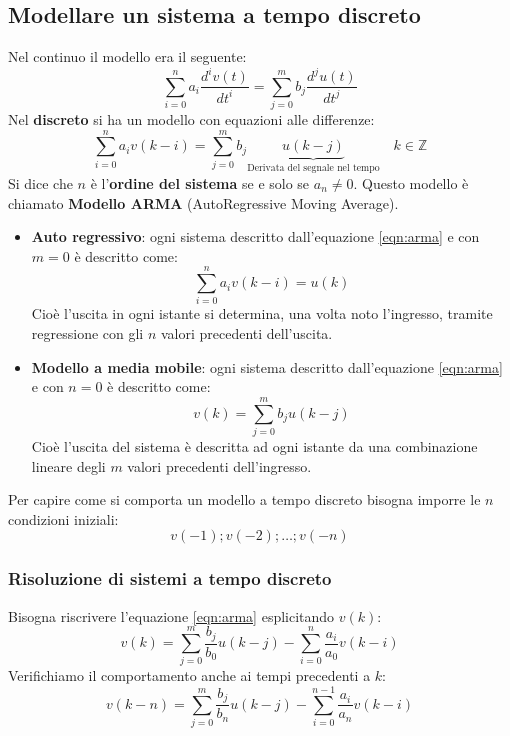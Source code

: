 \documentclass[a4paper]{article}
\begin{document}
\subsection{Modellare un sistema a tempo discreto}
Nel continuo il modello era il seguente:
\[
    \sum_{i = 0}^{n} a_i \frac{d^i v(t)}{dt^i} = \sum_{j = 0}^{m} b_j \frac{d^j u(t)}{dt^j}
\] 
Nel \textbf{discreto} si ha un modello con equazioni alle differenze:
\begin{equation}
  \label{eqn:arma}
    \sum_{i = 0}^{n} a_i v(k-i) = \sum_{j = 0}^{m} b_j 
    \underbrace{u(k-j)}_{\text{Derivata del segnale nel tempo}} \quad k \in \mathbb{Z}
\end{equation}
Si dice che \( n \) è l'\textbf{ordine del sistema} se e solo se \( a_n \neq 0 \).
Questo modello è chiamato \textbf{Modello ARMA} (AutoRegressive Moving Average).
\begin{itemize}
  \item \textbf{Auto regressivo}: ogni sistema descritto dall'equazione \ref{eqn:arma}
    e con \( m = 0 \) è descritto come:
    \[
      \sum_{i = 0}^{n} a_i v(k-i) = u(k)
    \] 
    Cioè l'uscita in ogni istante si determina, una volta noto l'ingresso, tramite
    regressione con gli \( n \) valori precedenti dell'uscita.
  \item \textbf{Modello a media mobile}: ogni sistema descritto dall'equazione \ref{eqn:arma}
    e con \( n = 0 \) è descritto come:
    \[
      v(k) = \sum_{j = 0}^{m} b_j u(k-j)
    \] 
    Cioè l'uscita del sistema è descritta ad ogni istante da una combinazione lineare
    degli \( m \) valori precedenti dell'ingresso.
\end{itemize}
Per capire come si comporta un modello a tempo discreto bisogna imporre le \( n \) condizioni
iniziali:
\[
  v(-1); v(-2); \ldots; v(-n)
\] 

\subsubsection{Risoluzione di sistemi a tempo discreto}
Bisogna riscrivere l'equazione \ref{eqn:arma} esplicitando \( v(k) \):
\[
  v(k) = \sum_{j = 0}^{m} \frac{b_j}{b_0} u(k-j) - \sum_{i = 0}^{n} \frac{a_i}{a_0} v(k-i)
\] 
Verifichiamo il comportamento anche ai tempi precedenti a \( k \):
\[
  v(k - n) = \sum_{j = 0}^{m} \frac{b_j}{b_n} u(k-j) - \sum_{i = 0}^{n-1} \frac{a_i}{a_n} v(k-i)
\] 
\end{document}
